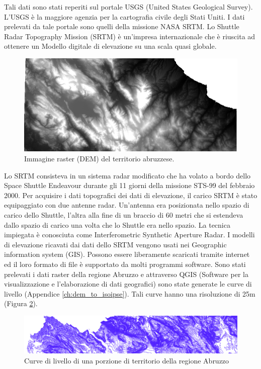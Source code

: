 Tali dati sono stati reperiti sul portale USGS (United States Geological Survey). L'USGS è la maggiore agenzia per la cartografia civile degli Stati Uniti. I dati prelevati da tale portale sono quelli della missione NASA SRTM.
Lo Shuttle Radar Topography Mission (SRTM) è un'impresa internazionale che è riuscita ad ottenere un Modello digitale di elevazione su una scala quasi globale. 

\begin{figure}[h]
	\centering
	\includegraphics[width=1\textwidth]{images/STRM.PNG}
	\caption{Immagine raster (DEM) del territorio abruzzese.}
	\label{fig:raster_abruzzo}
\end{figure}

Lo SRTM consisteva in un sistema radar modificato che ha volato a bordo dello Space Shuttle Endeavour durante gli 11 giorni della missione STS-99 del febbraio 2000. Per acquisire i dati topografici dei dati di elevazione, il carico SRTM è stato equipaggiato con due antenne radar. Un'antenna era posizionata nello spazio di carico dello Shuttle, l'altra alla fine di un braccio di 60 metri che si estendeva dallo spazio di carico una volta che lo Shuttle era nello spazio. La tecnica impiegata è conosciuta come Interferometric Synthetic Aperture Radar. I modelli di elevazione ricavati dai dati dello SRTM vengono usati nei Geographic information system (GIS). Possono essere liberamente scaricati tramite internet ed il loro formato di file è supportato da molti programmi software. Sono stati prelevati i dati raster della regione Abruzzo e attraverso QGIS (Software per la visualizzazione e l'elaborazione di dati geografici) sono state generate le curve di livello (Appendice \ref{ch:dem_to_isoipse}). Tali curve hanno una risoluzione di 25m (Figura \ref{fig:curve_di_livello}).

\begin{figure}[h]
	\centering
	\includegraphics[width=1\textwidth]{images/dettaglioCurve.PNG}
	\caption{Curve di livello di una porzione di territorio della regione Abruzzo}
	\label{fig:curve_di_livello}
\end{figure}

